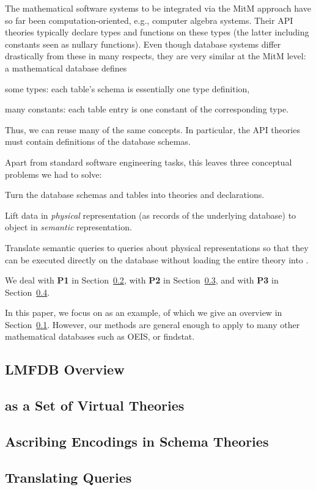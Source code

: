 The mathematical software systems to be integrated via the MitM approach have so far been computation-oriented, e.g., computer algebra systems.
Their API theories typically declare types and functions on these types (the latter including constants seen as nullary functions).
Even though database systems differ drastically from these in many respects, they are very similar at the MitM level: a mathematical database defines
\begin{compactitem}
 \item some types: each table's schema is essentially one type definition,
 \item many constants: each table entry is one constant of the corresponding type.
\end{compactitem}
Thus, we can reuse many of the same concepts.
In particular, the API theories must contain definitions of the database schemas. 

Apart from standard software engineering tasks, this leaves three conceptual problems we had to solve:
\begin{compactenum}[\bf P1]
\item Turn the database schemas and tables into \ommt theories and declarations. 
\item Lift data in \emph{physical} representation (as records of the
  underlying database) to \ommt object in \emph{semantic} representation.
\item Translate semantic queries to queries about physical representations so
  that they can be executed directly on the database without loading the entire theory into
  \mmt.
\end{compactenum}
We deal with \textbf{P1} in Section~\ref{sec:vt}, with \textbf{P2} in Section~\ref{sec:vt:codec}, and with \textbf{P3} in Section~\ref{sec:qmt}. 

In this paper, we focus on \lmfdb as an example, of which we give an overview in Section~\ref{sec:lmfdb}.
However, our methods are general enough to apply to many other mathematical databases such as OEIS, or findstat.

 \subsection{LMFDB Overview}\label{sec:lmfdb}
  
 \subsection[Virtual Theories]{\lmfdb as a Set of Virtual Theories}\label{sec:vt}
  
 \subsection{Ascribing Encodings in Schema Theories}\label{sec:vt:codec}
  
 \subsection{Translating Queries}\label{sec:qmt}
  


